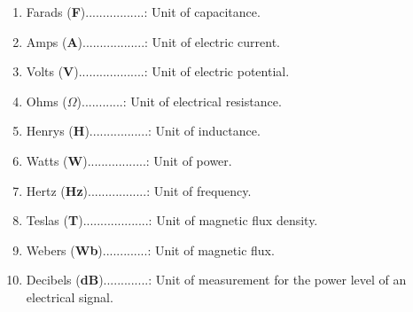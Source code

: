 \documentclass{article}
\begin{document}
\begin{enumerate}
    \item Farads (\textbf{F}).................: Unit of capacitance.
    \item Amps (\textbf{A})..................: Unit of electric current.
    \item Volts (\textbf{V})...................: Unit of electric potential.
    \item Ohms (\textbf{$\Omega$})............: Unit of electrical resistance.
    \item Henrys (\textbf{H}).................: Unit of inductance.
    \item Watts (\textbf{W}).................: Unit of power.
    \item Hertz (\textbf{Hz}).................: Unit of frequency.
    \item Teslas (\textbf{T})...................: Unit of magnetic flux density.
    \item Webers (\textbf{Wb}).............: Unit of magnetic flux.
    \item Decibels (\textbf{dB}).............: Unit of measurement for the power level of an electrical signal.
\end{enumerate}

\end{document}
